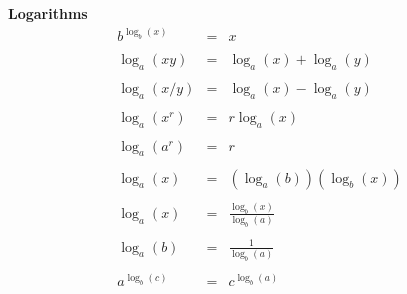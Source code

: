 \documentclass{article}
\begin{document}
 
\huge

{\bf Logarithms}
\begin{eqnarray*}
b^{\log_b(x)} &=& x
\\\\
\log_a(xy) &=& \log_a(x) + \log_a(y)
\\\\
\log_a(x/y) &=& \log_a(x) - \log_a(y)
\\\\
\log_a(x^r) &=& r\log_a(x)
\\\\
\log_a(a^r) &=& r
\\\\
 \log_a(x) &=& (\log_a(b))(\log_b(x))
\\\\
 \log_a(x) &=& \frac{\log_b(x)}{\log_b(a)}
 \\\\
 \log_a(b) &=& \frac{1}{\log_b(a)}
 \\\\
a^{\log_b(c)} &=& c^{\log_b(a)}
\end{eqnarray*}
\end{document}
